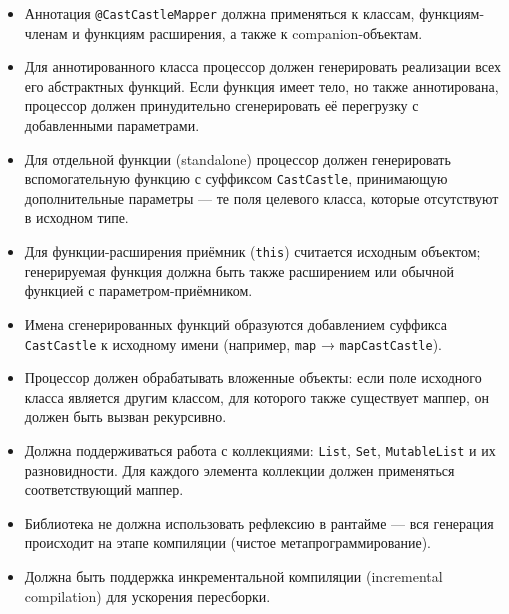 \begin{itemize}
    \item Аннотация \texttt{@CastCastleMapper} должна применяться к классам, функциям-членам и функциям расширения, а также к companion-объектам.
    \item Для аннотированного класса процессор должен генерировать реализации всех его абстрактных функций. Если функция имеет тело, но также аннотирована, процессор должен принудительно сгенерировать её перегрузку с добавленными параметрами.
    \item Для отдельной функции (standalone) процессор должен генерировать вспомогательную функцию с суффиксом \texttt{CastCastle}, принимающую дополнительные параметры — те поля целевого класса, которые отсутствуют в исходном типе.
    \item Для функции-расширения приёмник (\texttt{this}) считается исходным объектом; генерируемая функция должна быть также расширением или обычной функцией с параметром-приёмником.
    \item Имена сгенерированных функций образуются добавлением суффикса \texttt{CastCastle} к исходному имени (например, \texttt{map} → \texttt{mapCastCastle}).
    \item Процессор должен обрабатывать вложенные объекты: если поле исходного класса является другим классом, для которого также существует маппер, он должен быть вызван рекурсивно.
    \item Должна поддерживаться работа с коллекциями: \texttt{List}, \texttt{Set}, \texttt{MutableList} и их разновидности. Для каждого элемента коллекции должен применяться соответствующий маппер.
    \item Библиотека не должна использовать рефлексию в рантайме — вся генерация происходит на этапе компиляции (чистое метапрограммирование).
    \item Должна быть поддержка инкрементальной компиляции (incremental compilation) для ускорения пересборки.
\end{itemize}

